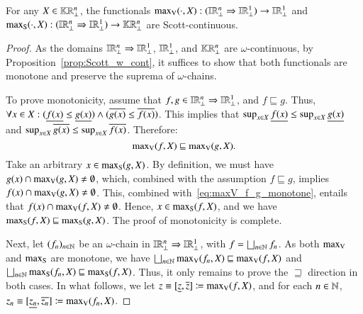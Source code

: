 \documentclass[11pt,times]{article}
\begin{document}
\begin{theorem}
  \label{thm:maxV_maxS_Scott_Cont}
  For any $X \in \kCPPO{\R^n\lift}$, the functionals
  $\maxV(\cdot , X): (\intvaldom[\R^n\lift] \Rightarrow
  \intvaldom[\R^1\lift]) \to \intvaldom[\R^1\lift]$ and
  $\maxS( \cdot, X): (\intvaldom[\R^n\lift] \Rightarrow
  \intvaldom[\R^1\lift]) \to \kCPPO{\R^n\lift}$ are Scott-continuous.
\end{theorem}

\begin{proof}
  As the domains
  $\intvaldom[\R^n\lift] \Rightarrow \intvaldom[\R^1\lift]$,
  $\intvaldom[\R^1\lift]$, and $\kCPPO{\R^n\lift}$ are
  $\omega$-continuous, by Proposition~\ref{prop:Scott_w_cont}, it
  suffices to show that both functionals are monotone and preserve the
  suprema of $\omega$-chains.


  
To prove monotonicity, assume that
$f,g \in \intvaldom[\R^n\lift] \Rightarrow \intvaldom[\R^1\lift]$, and
$f \sqsubseteq g$. Thus,
$\forall x \in X: (\lep[f(x)] \leq \lep[g(x)]) \wedge (\uep[g(x)] \leq
\uep[f(x)])$. This implies that
$\sup_{x \in X} \lep[f(x)] \leq \sup_{x \in X} \lep[g(x)]$ and
$\sup_{x \in X} \uep[g(x)] \leq \sup_{x \in X} \uep[f(x)]$. Therefore:
  \begin{equation}
    \label{eq:maxV_f_g_monotone}
    \maxV(f,X) \sqsubseteq \maxV(g,X).
  \end{equation}
  Take an arbitrary $x \in \maxS(g,X)$. By definition, we must have
  $g(x) \cap \maxV(g,X) \neq \emptyset$, which, combined with the
  assumption $f \sqsubseteq g$, implies
  $f(x) \cap \maxV(g,X) \neq \emptyset$. This, combined
  with~\eqref{eq:maxV_f_g_monotone}, entails that
  $f(x) \cap \maxV(f,X) \neq \emptyset$. Hence, $x \in \maxS(f,X)$,
  and we have $\maxS(f,X) \sqsubseteq \maxS(g,X)$. The proof of
  monotonicity is complete.



  
  Next, let $(f_n)_{n \in \N}$ be an $\omega$-chain in
  $\intvaldom[\R^n\lift] \Rightarrow \intvaldom[\R^1\lift]$, with
  $f = \bigsqcup_{n \in \N} f_n$. As both $\maxV$ and $\maxS$ are
  monotone, we have
  $\bigsqcup_{n \in \N} \maxV(f_n,X) \sqsubseteq \maxV(f,X)$ and
  $\bigsqcup_{n \in \N} \maxS(f_n,X) \sqsubseteq \maxS(f,X)$. Thus, it
  only remains to prove the $\sqsupseteq$ direction in both cases. In
  what follows, we let
  $z \equiv [\lep[z], \uep[z]] \defeq \maxV(f,X)$, and for each
  $n \in \N$, $z_n \equiv [\lep[z_n], \uep[z_n]] \defeq \maxV(f_n,X)$.




\end{proof}
\end{document}
